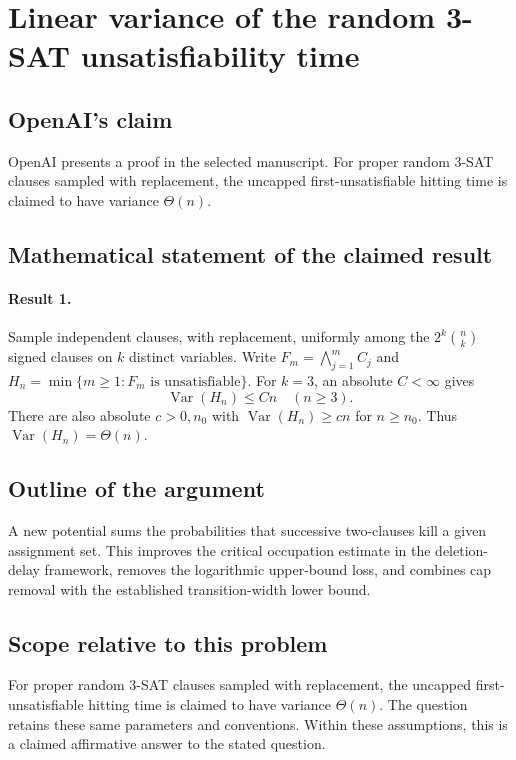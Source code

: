 \documentclass[11pt]{article}
\begin{document}
\section*{Linear variance of the random 3-SAT unsatisfiability time}

\subsection{OpenAI's claim}
OpenAI presents a proof in the selected manuscript. For proper random 3-SAT clauses sampled with replacement, the uncapped first-unsatisfiable hitting time is claimed to have variance $\Theta(n)$.

\subsection{Mathematical statement of the claimed result}
\paragraph{Result 1.} Sample independent clauses, with replacement, uniformly among the $2^k\binom nk$ signed clauses on $k$ distinct variables. Write $F_m=\bigwedge_{j=1}^mC_j$ and $H_n=\min\{m\ge1:F_m\text{ is unsatisfiable}\}$. For $k=3$, an absolute $C<\infty$ gives
\[
 \operatorname{Var}(H_n)\le Cn\quad(n\ge3).
\]
There are also absolute $c>0,n_0$ with $\operatorname{Var}(H_n)\ge cn$ for $n\ge n_0$. Thus $\operatorname{Var}(H_n)=\Theta(n)$.

\subsection{Outline of the argument}
A new potential sums the probabilities that successive two-clauses kill a given assignment set. This improves the critical occupation estimate in the deletion-delay framework, removes the logarithmic upper-bound loss, and combines cap removal with the established transition-width lower bound.

\subsection{Scope relative to this problem}
For proper random 3-SAT clauses sampled with replacement, the uncapped first-unsatisfiable hitting time is claimed to have variance $\Theta(n)$. The question retains these same parameters and conventions. Within these assumptions, this is a claimed affirmative answer to the stated question.
\end{document}
